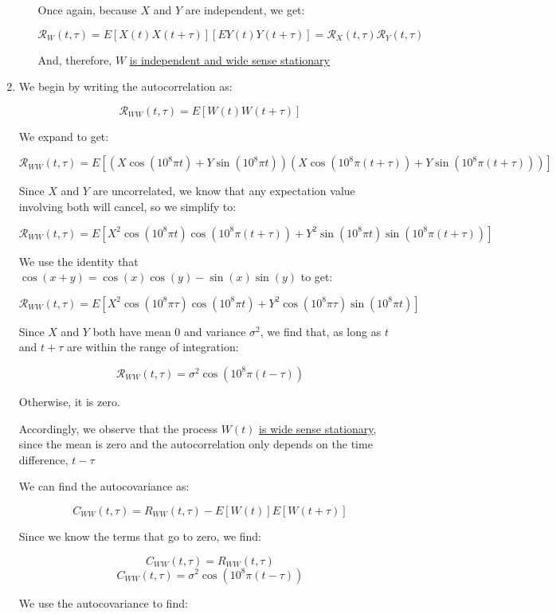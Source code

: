 \begin{enumerate}
\begin{enumerate}
        Once again, because $X$ and $Y$ are independent, we get:

        $$\boxed{\mathcal{R}_W(t,\tau)=E[X(t)X(t+\tau)][EY(t)Y(t+\tau)]=\mathcal{R}_X(t,\tau)\mathcal{R}_Y(t,\tau)}$$

        And, therefore, $W$ \underline{is independent and wide sense stationary}

    \end{enumerate}

  \item We begin by writing the autocorrelation as:

    $$\mathcal{R}_{WW}(t,\tau)=E[W(t)W(t+\tau)]$$

    We expand to get:

    $$\mathcal{R}_{WW}(t,\tau)=E[(X\cos(10^8\pi t)+Y\sin(10^8\pi t))(X\cos(10^8\pi(t+\tau))+Y\sin(10^8\pi(t+\tau)))]$$

    Since $X$ and $Y$ are uncorrelated, we know that any expectation value involving both will cancel, so we simplify to:

    $$\mathcal{R}_{WW}(t,\tau)=E[X^2\cos(10^8\pi t)\cos(10^8\pi(t+\tau))+Y^2\sin(10^8\pi t)\sin(10^8\pi(t+\tau))]$$

    We use the identity that $\cos(x+y)=\cos(x)\cos(y)-\sin(x)\sin(y)$ to get:

    $$\mathcal{R}_{WW}(t,\tau)=E[X^2\cos(10^8\pi \tau)\cos(10^8\pi t)+Y^2\cos(10^8\pi\tau)\sin(10^8\pi t)]$$

    Since $X$ and $Y$ both have mean 0 and variance $\sigma^2$, we find that, as long as $t$ and $t+\tau$ are within the range of integration:

    $$\boxed{\mathcal{R}_{WW}(t,\tau)=\sigma^2\cos(10^8\pi (t-\tau))}$$

    Otherwise, it is zero.

    Accordingly, we observe that the process $W(t)$ \underline{is wide sense stationary}, since the mean is zero and the autocorrelation only depends on the time difference, $t-\tau$

    We can find the autocovariance as:

    $$C_{WW}(t,\tau)=R_{WW}(t,\tau)-E[W(t)]E[W(t+\tau)]$$

    Since we know the terms that go to zero, we find:

    $$C_{WW}(t,\tau)=R_{WW}(t,\tau)$$
    $$\boxed{C_{WW}(t,\tau)=\sigma^2\cos(10^8\pi (t-\tau))}$$

    We use the autocovariance to find:


\end{enumerate}
